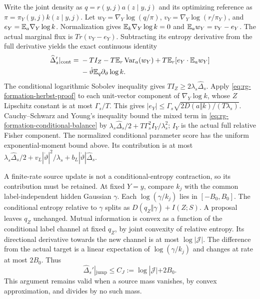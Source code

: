 Write the joint density as $q=r(y,j)a(z\mid y,j)$ and its
optimizing reference as $\pi=\pi_Y(y,j)k(z\mid y,j)$.
Let
$w_Y=\nabla_Y\log(q/\pi)$,
$v_Y=\nabla_Y\log(r/\pi_Y)$, and
$e_Y=\mathbb E_a\nabla_Y\log k$. Normalization gives
$\mathbb E_k\nabla_Y\log k=0$ and $\mathbb E_aw_Y=v_Y-e_Y$.
The actual marginal flux is $Tr(v_Y-e_Y)$.
Subtracting its entropy derivative from the full derivative yields
the exact continuous identity
\begin{align}
 \widehat\Delta_s'|_{\mathrm{cont}}
 ={}&-TI_Z
      -T\mathbb E_r\operatorname{Var}_a(w_Y)
      +T\mathbb E_r[e_Y\cdot\mathbb E_aw_Y]
 \notag\\
 &-\dot\vartheta \mathbb E_q\partial_\vartheta\log k.
 \label{eq:rg-formation-conditional-balance}
\end{align}
The conditional logarithmic Sobolev inequality gives
$TI_Z\ge2\lambda_s\widehat\Delta_s$.
Apply \cref{eq:rg-formation-herbst-proof} to each unit-vector
component of $\nabla_Y\log k$, whose $Z$ Lipschitz constant is at
most $\Gamma_s/T$. This gives
$|e_Y|\le\Gamma_s\sqrt{2D(a\Vert k)/(T\lambda_s)}$.
Cauchy--Schwarz and Young's inequality bound the mixed term in
\cref{eq:rg-formation-conditional-balance} by
$\lambda_s\widehat\Delta_s/2+
T\Gamma_s^2I_Y/\lambda_s^2$; $I_Y$ is the actual full relative
Fisher component. The normalized conditional parameter score has
the uniform exponential-moment bound above. Its contribution is at
most
$\lambda_s\widehat\Delta_s/2+
v_L|\dot\vartheta|^2/\lambda_s+
b_L|\dot\vartheta|\widehat\Delta_s$.

A finite-rate source update is not a conditional-entropy contraction,
so its contribution must be retained. At fixed $Y=y$, compare $k_j$
with the common label-independent hidden Gaussian $\gamma$.
Each $\log(\gamma/k_j)$ lies in $[-B_0,B_0]$.
The conditional entropy relative to $\gamma$ splits as
$D(q_Z\Vert\gamma)+I(Z;S)$.
A proposal leaves $q_Z$ unchanged. Mutual information is convex as
a function of the conditional label channel at fixed $q_Z$, by joint
convexity of relative entropy. Its directional derivative towards
the new channel is at most $\log|\mathcal J|$.
The difference from the actual target is a linear expectation of
$\log(\gamma/k_j)$ and changes at rate at most $2B_0$.
Thus
\begin{equation}
 \widehat\Delta_s'|_{\mathrm{jump}}\le
 C_J:=\log|\mathcal J|+2B_0.
 \label{eq:rg-formation-conditional-jump-remainder}
\end{equation}
This argument remains valid when a source mass vanishes, by convex
approximation, and divides by no such mass.

